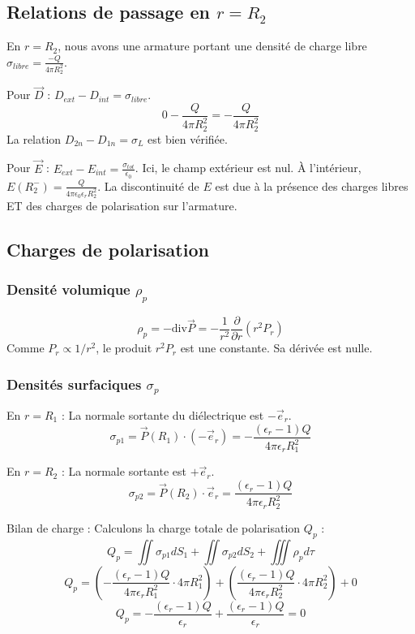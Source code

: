 \documentclass[french]{yLectureNote}
\renewcommand{\vec}{\overrightarrow}
\begin{document}
\subsection{Relations de passage en $r = R_2$}

En $r = R_2$, nous avons une armature portant une densité de charge libre $\sigma_{libre} = \frac{-Q}{4\pi R_2^2}$.

Pour $\vec{D}$ : $D_{ext} - D_{int} = \sigma_{libre}$.
    $$0 - \frac{Q}{4\pi R_2^2} = -\frac{Q}{4\pi R_2^2}$$
    La relation $D_{2n} - D_{1n} = \sigma_L$ est bien vérifiée.

Pour $\vec{E}$ : $E_{ext} - E_{int} = \frac{\sigma_{tot}}{\epsilon_0}$.
    Ici, le champ extérieur est nul. À l'intérieur, $E(R_2^-) = \frac{Q}{4\pi \epsilon_0 \epsilon_r R_2^2}$.
    La discontinuité de $E$ est due à la présence des charges libres ET des charges de polarisation sur l'armature.

\subsection{Charges de polarisation}

\subsubsection{Densité volumique $\rho_p$}
$$\rho_p = -\text{div} \vec{P} = -\frac{1}{r^2} \frac{\partial}{\partial r}(r^2 P_r)$$
Comme $P_r \propto 1/r^2$, le produit $r^2 P_r$ est une constante. Sa dérivée est nulle.

\subsubsection{Densités surfaciques $\sigma_p$}
En $r = R_1$ : La normale sortante du diélectrique est $-\vec{e}_r$.
    $$\sigma_{p1} = \vec{P}(R_1) \cdot (-\vec{e}_r) = - \frac{(\epsilon_r - 1)Q}{4\pi \epsilon_r R_1^2}$$

    En $r = R_2$ : La normale sortante est $+\vec{e}_r$.
    $$\sigma_{p2} = \vec{P}(R_2) \cdot \vec{e}_r = \frac{(\epsilon_r - 1)Q}{4\pi \epsilon_r R_2^2}$$

Bilan de charge :
Calculons la charge totale de polarisation $Q_p$ :
$$Q_p = \iint \sigma_{p1} dS_1 + \iint \sigma_{p2} dS_2 + \iiint \rho_p d\tau$$
$$Q_p = \left( - \frac{(\epsilon_r - 1)Q}{4\pi \epsilon_r R_1^2} \cdot 4\pi R_1^2 \right) + \left( \frac{(\epsilon_r - 1)Q}{4\pi \epsilon_r R_2^2} \cdot 4\pi R_2^2 \right) + 0$$
$$Q_p = - \frac{(\epsilon_r - 1)Q}{\epsilon_r} + \frac{(\epsilon_r - 1)Q}{\epsilon_r} = 0$$
\end{document}
